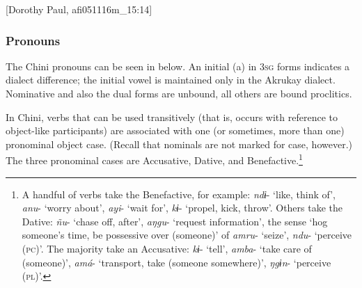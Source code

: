 \documentclass[output=paper]{langscibook}
\begin{document}
[Dorothy Paul, afi051116m\_15:14]
\z
\z



\subsubsection{{Pronouns}}\label{sec:brooks:2.2.1}

The Chini pronouns can be seen in  below. An initial (a) in 3\textsc{sg} forms indicates a dialect difference; the initial vowel is maintained only in the Akrukay dialect. Nominative and also the dual forms are unbound, all others are bound proclitics.

 In Chini, verbs that can be used transitively (that is, occurs with reference to object-like participants) are associated with one (or sometimes, more than one) pronominal object case. (Recall that nominals are not marked for case, however.) The three pronominal cases are Accusative, Dative, and Benefactive.\footnote{A handful of verbs take the Benefactive, for example: \textit{ndɨ}- ‘like, think of’, \textit{anu}- ‘worry about’, \textit{ayi}- ‘wait for’, \textit{kɨ}- ‘propel, kick, throw’. Others take the Dative: \textit{ñu}- ‘chase off, after’, \textit{aŋgu}- ‘request information’, the sense ‘hog someone’s time, be possessive over (someone)’ of \textit{amru}- ‘seize’, \textit{ndu}- ‘perceive (\textsc{pc})’. The majority take an Accusative: \textit{kɨ}- ‘tell’, \textit{amba}- ‘take care of (someone)’, \textit{amá}- ‘transport, take (someone somewhere)’, \textit{ŋgɨn}- ‘perceive (\textsc{pl})’.}
\end{document}
